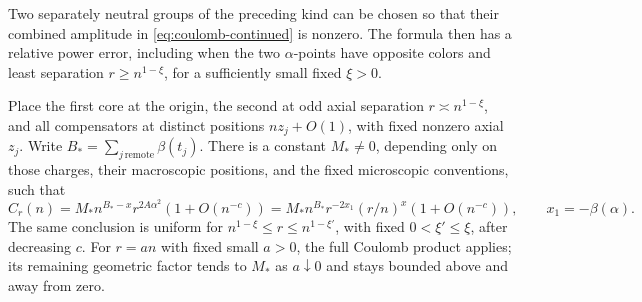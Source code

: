 \begin{proposition}\label{prop:special-charges}
Two separately neutral groups of the preceding kind can be chosen
so that their combined amplitude in
\eqref{eq:coulomb-continued} is nonzero.  The formula then has a
relative power error, including when the two $\alpha$-points have
opposite colors and least separation $r\ge n^{1-\xi}$, for a
sufficiently small fixed $\xi>0$.

Place the first core at the origin, the second at odd axial separation
$r\asymp n^{1-\xi}$, and all compensators at distinct positions
$n z_j+O(1)$, with fixed nonzero axial $z_j$.  Write
$B_* =\sum_{j\,\mathrm{remote}}\beta(t_j)$.
There is a constant $M_*\ne0$, depending only on those charges,
their macroscopic positions, and the fixed microscopic conventions,
such that
\begin{equation}\label{eq:special-close-pair}
 C_r(n)=M_*n^{B_*-x}r^{2A\alpha^2}(1+O(n^{-c}))
       =M_*n^{B_*}r^{-2x_1}(r/n)^x(1+O(n^{-c})),
 \qquad x_1=-\beta(\alpha).
\end{equation}
The same conclusion is uniform for
$n^{1-\xi}\le r\le n^{1-\xi'}$, with fixed $0<\xi'\le\xi$,
after decreasing $c$.  For $r=an$ with fixed small $a>0$, the full
Coulomb product applies; its remaining geometric factor tends to
$M_*$ as $a\downarrow0$ and stays bounded above and away from zero.
\end{proposition}

